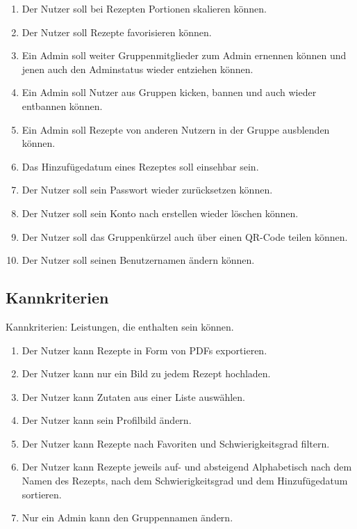 \documentclass[parskip=full]{scrartcl}
\begin{document}
\begin{enumerate}[start=1,label={$\langle$\bfseries RS\arabic*$\rangle$}, leftmargin = 5em, itemsep=4pt, parsep=4pt]
    \item Der Nutzer soll bei Rezepten Portionen skalieren können.\label{RS1}
    \item Der Nutzer soll Rezepte favorisieren können.\label{RS2}
    \item Ein \Gls{Admin} soll weiter Gruppenmitglieder zum Admin ernennen können und jenen auch den Adminstatus wieder entziehen können.\label{RS3}
    \item Ein Admin soll Nutzer aus Gruppen kicken, bannen und auch wieder entbannen können.\label{RS4}
    \item Ein Admin soll Rezepte von anderen Nutzern in der Gruppe ausblenden können.\label{RS5}
    \item Das Hinzufügedatum eines Rezeptes soll einsehbar sein.\label{RS7}
    \item Der Nutzer soll sein Passwort wieder zurücksetzen können.\label{RS8}
    \item Der Nutzer soll sein Konto nach erstellen wieder löschen können.\label{RS9}
    \item Der Nutzer soll das Gruppenkürzel auch über einen QR-Code teilen können.\label{RS10}
    \item Der Nutzer soll seinen Benutzernamen ändern können.\label{RS11}
\end{enumerate}

\subsection{Kannkriterien}
Kannkriterien: Leistungen, die enthalten sein können.

\begin{enumerate}[start=1,label={$\langle$\bfseries RC\arabic*$\rangle$}, leftmargin = 5em, itemsep=4pt, parsep=4pt]
    \item Der Nutzer kann Rezepte in Form von PDFs exportieren.\label{RC1}
    \item Der Nutzer kann nur ein Bild zu jedem Rezept hochladen.\label{RC2}
    \item Der Nutzer kann Zutaten aus einer Liste auswählen.\label{RC3}
    \item Der Nutzer kann sein Profilbild ändern.\label{RC4}
    \item Der Nutzer kann Rezepte nach Favoriten und Schwierigkeitsgrad filtern.\label{RC5}
    \item Der Nutzer kann Rezepte jeweils auf- und absteigend Alphabetisch nach dem Namen des Rezepts, nach dem Schwierigkeitsgrad und dem Hinzufügedatum sortieren.\label{RC6}
    \item Nur ein Admin kann den Gruppennamen ändern.\label{RC7}
\end{enumerate}
\end{document}
